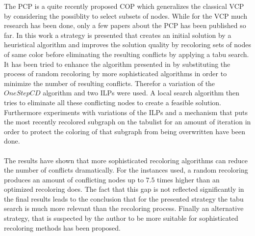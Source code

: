 
The PCP is a quite recently proposed COP which generalizes the classical VCP by considering the possiblity to select subsets of nodes. While for the VCP much research has been done, only a few papers about the PCP has been published so far. In this work a strategy is presented that creates an initial solution by a heuristical algorithm and improves the solution quality by recoloring sets of nodes of same color before eliminating the resulting conflicts by applying a tabu search. It has been tried to enhance the algorithm presented in \cite{noronha-06} by substituting the process of random recoloring by more sophisticated algorithms in order to minimize the number of resulting conflicts. Therefor a variation of the $\mathit{OneStepCD}$ algorithm \cite{li-00} and two ILPs were used. A local search algorithm then tries to eliminate all these conflicting nodes to create a feasible solution. Furthermore experiments with variations of the ILPs and a mechanism that puts the most recently recolored subgraph on the tabulist for an amount of iteration in order to protect the coloring of that subgraph from being overwritten have been done.\\\\
The results have shown that more sophisticated recoloring algorithms can reduce the number of conflicts dramatically. For the instances used, a random recoloring produces an amount of conflicting nodes up to $7.5$ times higher than an optimized recoloring does. The fact that this gap is not reflected significantly in the final results leads to the conclusion that for the presented strategy the tabu search is much more relevant than the recoloring process. Finally an alternative strategy, that is suspected by the author to be more suitable for sophisticated recoloring methods has been proposed.
